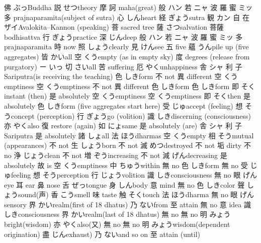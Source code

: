 	
{佛}	{ぶっ}{Buddha}
{説}	{せつ}{theory}
{摩}	{}{}
{訶}	{}{maha(great)}
{般}	{ハン}{}
{若}	{ニャ}{}
{波}	{}{}
{羅}	{}{}
{蜜}	{ミッ}{}
{多}	{}{prajnaparamita(subject of sutra)}
{心}	{しん}{heart}
{経}	{ぎょう}{sutra}
{観}	{カン}{}
{自}	{}{}
{在}	{ザイ}{Avalokita--Kannon (speaking)}
{菩}	{}{sacred tree}
{薩}	{さつ}{salvation 菩薩 bodhisattva}
{行}	{ぎょう}{practice}
{深}	{じん}{deep}
{般}	{ハン}{}
{若}	{ニャ}{}
{波}	{}{}
{羅}	{}{}
{蜜}	{ミッ}{}
{多}	{}{prajnaparamita}
{時}	{}{now}
{照}	{しょう}{clearly}
{見}	{けん}{see}
{五}	{}{five}
{蘊}	{うん}{pile up (five aggregates) }
{皆}	{かい}{all}
{空}	{くう}{empty (as in empty sky)}
{度}	{}{degrees (release from purgatory)}
{ー}	{いっ}{}
{切}	{さい}{all}
{苦}	{}{suffering}
{厄}	{やく}{unhappiness}
{舎}	{シャ}{}
{利}	{}{}
{子}	{}{Sariputra(is receiving the teaching)}
{色}	{しき}{form}
{不}	{}{not}
{異}	{}{different}
{空}	{くう}{emptiness}
{空}	{くう}{emptiness}
{不}	{}{not}
{異}	{}{different}
{色}	{しき}{form}
{色}	{しき}{form}
{即}	{そく}{instant (then)}
{是}	{}{absolutely}
{空}	{くう}{emptiness}
{空}	{くう}{emptiness}
{即}	{そく}{then}
{是}	{}{absolutely}
{色}	{しき}{form (five aggregates start here)}
{受}	{じゅ}{accept (feeling)}
{想}	{そう}{concept (perception)}
{行}	{ぎょう}{go (volition)}
{識}	{しき}{discerning (consciousness)}
{亦}	{やく}{also}
{復}	{}{restore (again)}
{如}	{にょ}{same}
{是}	{}{absolutely (are)}
{舎}	{シャ}{}
{利}	{}{}
{子}	{}{Sariputra}
{是}	{}{absolutely}
{諸}	{しょ}{all}
{法}	{ほう}{dharmas}
{空}	{くう}{empty}
{相}	{そう}{mutual (appearances)}
{不}	{}{not}
{生}	{しょう}{born}
{不}	{}{not}
{滅}	{めつ}{destroyed}
{不}	{}{not}
{垢}	{}{dirty}
{不}	{}{no}
{浄}	{じょう}{clean}
{不}	{not}
{増}	{ぞう}{increasing}
{不}	{}{not}
{減}	{げん}{decreasing}
{是}	{}{absolutely}
{故}	{}{is}
{空}	{くう}{emptiness}
{中}	{ちゅう}{within}
{無}	{}{no}
{色}	{しき}{form}
{無}	{}{no}
{受}	{じゅ}{feeling}
{想}	{そう}{perception}
{行}	{じょう}{volition}
{識}	{しき}{consciousness}
{無}	{}{no}
{眼}	{げん}{eye}
{耳}	{}{ear}
{鼻}	{}{nose}
{舌}	{ぜっ}{tongue}
{身}	{しん}{body}
{意}	{}{mind}
{無}	{}{no}
{色}	{しき}{color}
{聲}	{しょう}{sound(声)}
{香}	{こう}{smell}
{味}	{}{taste}
{触}	{そく}{touch}
{法}	{ほう}{dharma}
{無}	{}{no}
{眼}	{げん}{sensory}
{界}	{かい}{realm(first of 18 dhatus)}
{乃}	{ない}{from}
{至}	{}{attain}
{無}	{}{no}
{意}	{}{idea}
{識}	{しき}{consciousness}
{界}	{かい}{realm(last of 18 dhatus)}
{無}	{}{no}
{無}	{}{no}
{明}	{みょう}{bright(wisdom)}
{亦}	{やく}{also(又)}
{無}	{}{no}
{無}	{}{no}
{明}	{みょう}{wisdom(dependent origination)}
{盡}	{じん}{exhaust)}
{乃}	{ない}{and so on}
{至}	{}{attain (until)}
